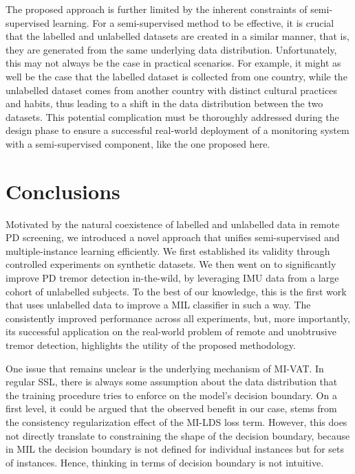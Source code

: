 \documentclass[journal,twoside,web]{ieeecolor}
\begin{document}
The proposed approach is further limited by the inherent constraints of
semi-supervised learning. For a semi-supervised method to be effective, it is
crucial that the labelled and unlabelled datasets are created in a similar manner,
that is, they are generated from the same underlying data distribution.
Unfortunately, this may not always be the case in practical scenarios. For
example, it might as well be the case that the labelled dataset is  collected
from one country, while the unlabelled dataset comes from another country with
distinct cultural practices and habits, thus leading to a shift in the data
distribution between the two datasets. This potential complication must be
thoroughly addressed during the design phase to ensure a successful real-world
deployment of a monitoring system with a semi-supervised component, like the one
proposed here.



\section{Conclusions}
\label{sec:conclusion}
Motivated by the natural coexistence of labelled and unlabelled data in remote
PD screening, we introduced a novel approach that unifies semi-supervised and
multiple-instance learning efficiently. We first established its validity 
through controlled experiments on synthetic datasets. We then went on to
significantly improve PD tremor detection in-the-wild, by leveraging IMU data
from a large cohort of unlabelled subjects. To the best of our knowledge, this
is the first work that uses unlabelled data to improve a MIL classifier in such
a way. The consistently improved performance across all experiments,
but, more importantly, its successful application on the real-world problem of
remote and unobtrusive tremor detection, 
highlights the utility of the proposed methodology.


\appendix
One issue that remains unclear is the underlying  mechanism of MI-VAT.   In
regular SSL, there is always some assumption about the data distribution that
the training procedure tries to enforce on the model's decision boundary. On a
first level, it could be argued that the observed benefit in our case, stems
from the consistency regularization effect of the MI-LDS loss term. However,
this does not directly translate to constraining the shape of the  decision
boundary, because in MIL the decision boundary  is not defined for individual
instances but for sets of instances. Hence, thinking in terms of  decision
boundary is not intuitive.
\end{document}
